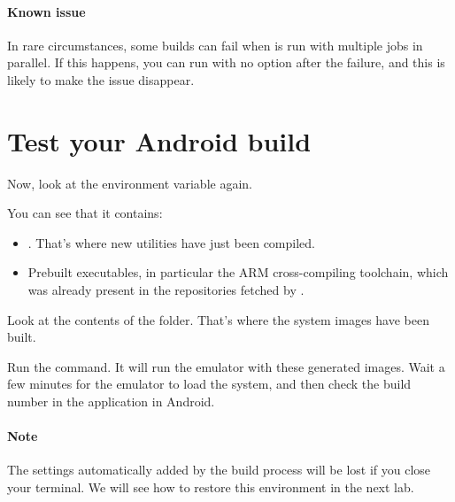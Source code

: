 \paragraph{Known issue}
In rare circumstances, some builds can fail when  is run
with multiple jobs in parallel. If this happens, you can run
 with no option after the failure, and this is likely to
make the issue disappear.

\section{Test your Android build}

Now, look at the  environment variable again.

You can see that it contains:
\begin{itemize}
\item
  .
  That's where new utilities have just been compiled.
\item Prebuilt executables, in particular the ARM cross-compiling
  toolchain, which was already present in the repositories fetched by
  .
\end{itemize}

Look at the contents of the  folder.
That's where the system images have been built.

Run the  command. It will run the emulator with these
generated images.  Wait a few minutes for the emulator to load the
system, and then check the build number in the 
application in Android.

\paragraph{Note}
The  settings automatically added by the build process will
be lost if you close your terminal. We will see how to restore this
environment in the next lab.

